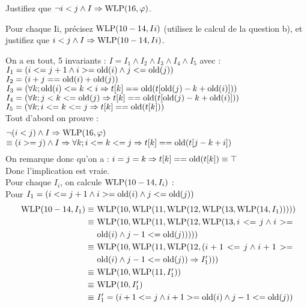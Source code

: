 \documentclass[11pt,answers]{exam}
\begin{document}
\begin{questions}
\begin{parts}
    Justifiez que $\neg i < j \land I \Rightarrow \mathrm{WLP}(16,\varphi)$.

    Pour chaque Ii, précisez $\mathrm{WLP}(10-14,Ii)$ (utilisez le calcul de la question b), et justifiez que $i < j \land I \Rightarrow \mathrm{WLP}(10-14,Ii)$.

    \begin{solutionorbox}
      On a en tout, 5 invariants : $I = I_1 \wedge I_2 \wedge I_3 \wedge I_4 \wedge I_5$ avec :\\
      $I_1 = (i <= j+1 \wedge i >= \mathrm{old}(i) \wedge j <= \mathrm{old}(j))$\\
      $I_2 = (i + j == \mathrm{old}(i) + \mathrm{old}(j))$\\
      $I_3 = (\forall k; \mathrm{old}(i) <= k < i \Rightarrow t[k] == \mathrm{old}(t[\mathrm{old}(j)-k+\mathrm{old}(i)]))$\\
      $I_4 = (\forall k; j < k <= \mathrm{old}(j) \Rightarrow t[k] == \mathrm{old}(t[\mathrm{old}(j)-k+\mathrm{old}(i)]))$\\
      $I_5 = (\forall k; i <= k <= j \Rightarrow t[k] == \mathrm{old}(t[k]))$\\
      Tout d'abord on prouve :
      $$\breaktowidth{12.7cm}{\neg(i<j) \wedge I \Rightarrow \WLP(16,\varphi)\\
      \equiv (i>=j) \wedge I \Rightarrow \forall k; i<=k<=j \Rightarrow t[k] == \old(t[j-k+i])}$$
      On remarque donc qu'on a : $i=j=k \Rightarrow t[k] == \mathrm{old}(t[k]) \equiv \top$\\
      Donc l'implication est vraie.\\
      Pour chaque $I_i$, on calcule $\mathrm{WLP}(10-14,I_i)$ : \\
      Pour $I_1 = (i <= j+1 \wedge i >= \mathrm{old}(i) \wedge j <= \mathrm{old}(j))$
      \begin{align*}
        \WLP(10-14,I_1) \equiv & ~\breaktowidth{8.2cm}{\WLP(10, \WLP(11, \WLP(12, \WLP(13, \WLP(14, I_1)))))}\\
        \equiv               & ~\breaktowidth{8.2cm}{\WLP(10, \WLP(11, \WLP(12, \WLP(13, i <= j \wedge i >= \old(i) \wedge j-1 <= \old(j)))))}\\
        \equiv               & ~\breaktowidth{8.2cm}{\WLP(10, \WLP(11, \WLP(12, (i+1 <= j \wedge i+1 >= \old(i) \wedge j-1 <= \old(j)) \Rightarrow I'_1)))}\\
        \equiv               & ~\breaktowidth{8.2cm}{\WLP(10, \WLP(11, I'_1))}\\
        \equiv               & ~\breaktowidth{8.2cm}{\WLP(10, I'_1)}\\
        \equiv               & ~\breaktowidth{8.2cm}{I'_1 = (i+1 <= j \wedge i+1 >= \old(i) \wedge j-1 <= \old(j))}

\end{align*}
\end{solutionorbox}
\end{parts}
\end{questions}
\end{document}
